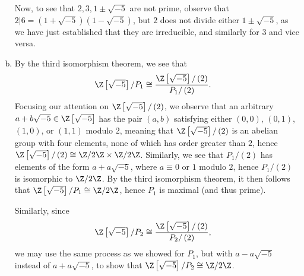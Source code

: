 \documentclass[10pt]{mypackage}
\begin{document}
\begin{solution}
\begin{enumerate}[(a)]
      Now, to see that $2, 3, 1\pm\sqrt{-5}$ are not prime, observe that $2 | 6 = \left( 1+\sqrt{-5} \right)\left( 1-\sqrt{-5} \right)$, but $2$ does not divide either $1\pm\sqrt{-5}$, as we have just established that they are irreducible, and similarly for $3$ and vice versa.
    \item By the third isomorphism theorem, we see that
      \begin{align*}
        \Z\left[ \sqrt{-5} \right]/P_1 &\cong \frac{\Z\left[ \sqrt{-5} \right]/\left( 2 \right)}{ P_1/\left( 2 \right) }.
      \end{align*}
      Focusing our attention on $ \Z\left[ \sqrt{-5} \right]/\left( 2 \right) $, we observe that an arbitrary $a + b\sqrt{-5}\in \Z\left[ \sqrt{-5} \right]$ has the pair $\left( a,b \right)$ satisfying either $\left( 0,0 \right)$, $\left( 0,1 \right)$, $\left( 1,0 \right)$, or $\left( 1,1 \right)$ modulo $2$, meaning that $\Z\left[ \sqrt{-5} \right]/\left( 2 \right)$ is an abelian group with four elements, none of which has order greater than $2$, hence $\Z\left[ \sqrt{-5} \right]/\left( 2 \right)\cong \Z/2\Z\times \Z/2\Z$. Similarly, we see that $P_1/\left( 2 \right)$ has elements of the form $a + a\sqrt{-5}$, where $a\equiv 0$ or $1$ modulo $2$, hence $P_1/\left( 2 \right)$ is isomorphic to $\Z/2\Z$. By the third isomorphism theorem, it then follows that $\Z\left[ \sqrt{-5} \right]/P_1\cong \Z/2\Z$, hence $P_1$ is maximal (and thus prime).\newline

      Similarly, since
      \begin{align*}
        \Z\left[ \sqrt{-5} \right]/P_2 &\cong \frac{\Z\left[ \sqrt{-5} \right]/\left( 2 \right)}{ P_2/\left( 2 \right) },
      \end{align*}
      we may use the same process as we showed for $P_1$, but with $a-a\sqrt{-5}$ instead of $a+a\sqrt{-5}$, to show that $\Z\left[ \sqrt{-5} \right]/P_2\cong \Z/2\Z$.
  \end{enumerate}
\end{solution}
\end{document}
